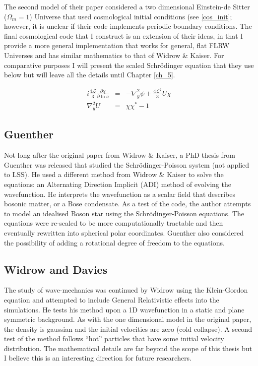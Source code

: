 The second model of their paper considered a two dimensional Einstein-de Sitter ($\Omega_m = 1$) Universe that used cosmological initial conditions (see \ref{cos_init}; however, it is unclear if their code implements periodic boundary conditions. The final cosmological code that I construct is an extension of their ideas, in that I provide a more general implementation that works for general, flat FLRW Universes and has similar mathematics to that of Widrow \& Kaiser. For comparative purposes I will present the scaled Schr\"odinger equation that they use below but will leave all the details until Chapter \ref{ch_5}.

\begin{eqnarray}
i\frac{4\mathcal{L}}{3} \frac{\partial\chi}{\partial \ln a} &=& -\nabla_y^2\psi + \frac{4\mathcal{L}^2}{3} U\chi \\
\nabla_y^2 U &=& \chi\chi^*  - 1
\end{eqnarray}

\subsection{Guenther}
Not long after the original paper from Widrow \& Kaiser, a PhD thesis from Guenther \citep{bib_glr} was released that studied the Schr\"odinger-Poisson system (not applied to LSS). He used a different method from Widrow \& Kaiser to solve the equations: an Alternating Direction Implicit (ADI) method of evolving the wavefunction. He interprets the wavefunction as a scalar field that describes bosonic matter, or a Bose condensate. As a test of the code, the author attempts to model an idealised Boson star using the Schr\"odinger-Poisson equations. The equations were re-scaled to be more computationally tractable and then eventually rewritten into spherical polar coordinates. Guenther also considered the possibility of adding a rotational degree of freedom to the equations.

\subsection{Widrow and Davies}
The study of wave-mechanics was continued by Widrow \citep{bib_wid} using the Klein-Gordon equation and attempted to include General Relativistic effects into the simulations. He tests his method upon a 1D wavefunction in a static and plane symmetric background. As with the one dimensional model in the original paper, the density is gaussian and the initial velocities are zero (cold collapse). A second test of the method follows ``hot'' particles that have some initial velocity distribution. The mathematical details are far beyond the scope of this thesis but I believe this is an interesting direction for future researchers.

